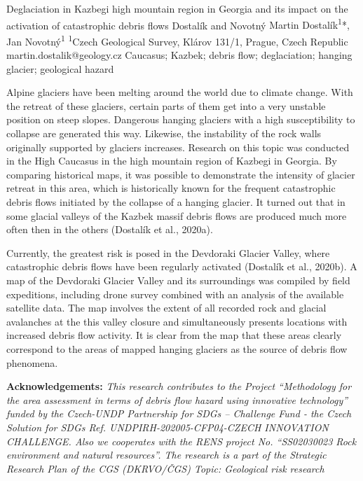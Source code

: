 \abstract
{Deglaciation in Kazbegi high mountain region in Georgia and its impact on the activation of catastrophic debris flows} 
{Dostalík and Novotný} 
{Martin Dostalík\textsuperscript{1}*, Jan Novotný\textsuperscript{1}} 
{\TLtag} 
{
\textsuperscript{1}Czech Geological Survey, Klárov 131/1, Prague, Czech Republic
}
{martin.dostalik@geology.cz}  %
{Caucasus; Kazbek; debris flow; deglaciation; hanging glacier; geological hazard}
{Alpine glaciers have been melting around the world due to climate change. With the retreat of these glaciers, certain parts of them get into a very unstable position on steep slopes. Dangerous hanging glaciers with a high susceptibility to collapse are generated this way. Likewise, the instability of the rock walls originally supported by glaciers increases. 
Research on this topic was conducted in the High Caucasus in the high mountain region of Kazbegi in Georgia. By comparing historical maps, it was possible to demonstrate the intensity of glacier retreat in this area, which is historically known for the frequent catastrophic debris flows initiated by the collapse of a hanging glacier. It turned out that in some glacial valleys of the Kazbek massif debris flows are produced much more often then in the others (Dostalík et al., 2020a). 

Currently, the greatest risk is posed in the Devdoraki Glacier Valley, where catastrophic debris flows have been regularly activated (Dostalík et al., 2020b). A map of the Devdoraki Glacier Valley and its surroundings was compiled by field expeditions, including drone survey combined with an analysis of the available satellite data. The map involves the extent of all recorded rock and glacial avalanches at the this valley closure and simultaneously presents locations with increased debris flow activity. It is clear from the map that these areas clearly correspond to the areas of mapped hanging glaciers as the source of debris flow phenomena.

\vspace{0.5em}
\noindent
\textbf{Acknowledgements:}
\textit{This research contributes to the Project \enquote{Methodology for the area assessment in terms of debris flow hazard using innovative technology} funded by the Czech-UNDP Partnership for SDGs – Challenge Fund - the Czech Solution for SDGs Ref. UNDPIRH-202005-CFP04-CZECH INNOVATION CHALLENGE. 
Also we cooperates with the RENS project No. \enquote{SS02030023 Rock environment and natural resources}.
The research is a part of the Strategic Research Plan of the CGS (DKRVO/ČGS) Topic: Geological risk research}
}
